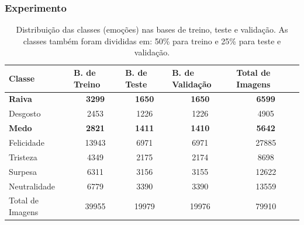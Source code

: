 \documentclass{beamer}
\begin{document}
\begin{frame}
\frametitle{Experimento}
\begin{table}[]
\tiny
\centering
\caption{Distribuição das classes (emoções) nas bases de treino, teste e validação. As classes também foram divididas em: 50\% para treino e 25\% para teste e validação.}
\label{table:distclasse}
\begin{tabular}{lcccc}
\hline
\textbf{Classe}  & \multicolumn{1}{l}{\textbf{B. de Treino}} & \multicolumn{1}{l}{\textbf{B. de Teste}} & \multicolumn{1}{l}{\textbf{B. de Validação}} & \multicolumn{1}{l}{\textbf{Total de Imagens}} \\ \hline
\scriptsize \textbf{Raiva}            & \scriptsize \textbf{3299}                                        & \scriptsize \textbf{1650}                                       & \scriptsize \textbf{1650}                                           & \scriptsize \textbf{6599}                                          \\
\scriptsize Desgosto         & \scriptsize 2453                                        & \scriptsize 1226                                       & \scriptsize 1226                                           & \scriptsize 4905                                          \\
\scriptsize \textbf{Medo}             & \scriptsize \textbf{2821}                                        & \scriptsize \textbf{1411}                                       & \scriptsize \textbf{1410}                                           & \scriptsize \textbf{5642}                                          \\
Felicidade       & 13943                                       & 6971                                       & 6971                                           & 27885                                         \\
Tristeza         & 4349                                        & 2175                                       & 2174                                           & 8698                                          \\
Surpesa          & 6311                                        & 3156                                       & 3155                                           & 12622                                         \\
Neutralidade     & 6779                                        & 3390                                       & 3390                                           & 13559                                         \\
Total de Imagens & 39955                                       & 19979                                      & 19976                                          & 79910                                         \\ \hline
\end{tabular}
\end{table}
\end{frame}
\end{document}
